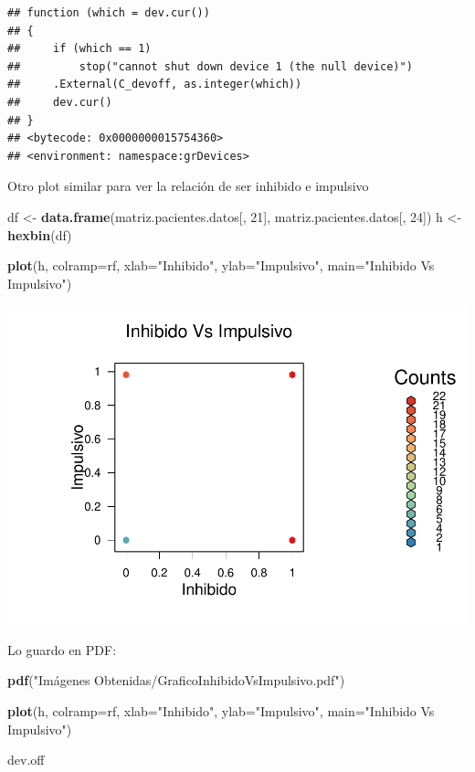 \documentclass[]{article}
\newenvironment{Shaded}{\begin{snugshade}}{\end{snugshade}}
\newcommand{\KeywordTok}[1]{\textcolor[rgb]{0.13,0.29,0.53}{\textbf{#1}}}
\newcommand{\DataTypeTok}[1]{\textcolor[rgb]{0.13,0.29,0.53}{#1}}
\newcommand{\DecValTok}[1]{\textcolor[rgb]{0.00,0.00,0.81}{#1}}
\newcommand{\StringTok}[1]{\textcolor[rgb]{0.31,0.60,0.02}{#1}}
\newcommand{\NormalTok}[1]{#1}
\begin{document}
\begin{verbatim}
## function (which = dev.cur()) 
## {
##     if (which == 1) 
##         stop("cannot shut down device 1 (the null device)")
##     .External(C_devoff, as.integer(which))
##     dev.cur()
## }
## <bytecode: 0x0000000015754360>
## <environment: namespace:grDevices>
\end{verbatim}

Otro plot similar para ver la relación de ser inhibido e impulsivo

\begin{Shaded}
\begin{Highlighting}[]
\NormalTok{df <-}\StringTok{ }\KeywordTok{data.frame}\NormalTok{(matriz.pacientes.datos[, }\DecValTok{21}\NormalTok{], matriz.pacientes.datos[, }\DecValTok{24}\NormalTok{])}
\NormalTok{h <-}\StringTok{ }\KeywordTok{hexbin}\NormalTok{(df)}

\KeywordTok{plot}\NormalTok{(h, }\DataTypeTok{colramp=}\NormalTok{rf, }\DataTypeTok{xlab=}\StringTok{"Inhibido"}\NormalTok{, }\DataTypeTok{ylab=}\StringTok{"Impulsivo"}\NormalTok{, }\DataTypeTok{main=}\StringTok{"Inhibido Vs Impulsivo"}\NormalTok{)}
\end{Highlighting}
\end{Shaded}

\includegraphics{codigo_files/figure-latex/grafico_inhibido_impulsivo-1.pdf}

Lo guardo en PDF:

\begin{Shaded}
\begin{Highlighting}[]
\KeywordTok{pdf}\NormalTok{(}\StringTok{"Imágenes Obtenidas/GraficoInhibidoVsImpulsivo.pdf"}\NormalTok{)}

\KeywordTok{plot}\NormalTok{(h, }\DataTypeTok{colramp=}\NormalTok{rf, }\DataTypeTok{xlab=}\StringTok{"Inhibido"}\NormalTok{, }\DataTypeTok{ylab=}\StringTok{"Impulsivo"}\NormalTok{, }\DataTypeTok{main=}\StringTok{"Inhibido Vs Impulsivo"}\NormalTok{)}

\NormalTok{dev.off}
\end{Highlighting}
\end{Shaded}
\end{document}
